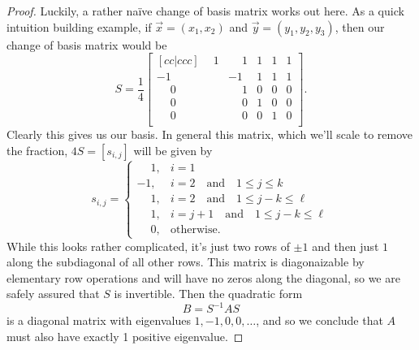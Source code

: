 \documentclass[12pt,oneside]{../../sfsuthesis}
\begin{document}
\begin{proof}
    Luckily, a rather na\"ive change of basis matrix works out here.
    As a quick intuition building example, if \( \vec{x} = ( x_1, x_2) \) and \( \vec{y} = (y_1, y_2, y_3) \), then our change of basis matrix would be
    \[
        S = \frac{1}{4}
        \begin{bmatrix}[cc|ccc]
            \phantom{-}1 & \phantom{-}1 & 1 & 1 & 1 \\
            -1           & -1           & 1 & 1 & 1 \\
            \phantom{-}0 & \phantom{-}1 & 0 & 0 & 0 \\
            \phantom{-}0 & \phantom{-}0 & 1 & 0 & 0 \\
            \phantom{-}0 & \phantom{-}0 & 0 & 1 & 0 \\
        \end{bmatrix}.
    \]
    Clearly this gives us our basis.
    In general this matrix, which we'll scale to remove the fraction, \( 4S = [s_{i,j}] \) will be given by
    \[
        s_{i,j}  = \begin{cases}
            \phantom{-}1, & i = 1                                                  \\
            -1,           & i = 2 \quad \text{and} \quad 1 \leq j \leq k           \\
            \phantom{-}1, & i = 2 \quad \text{and} \quad 1 \leq j-k \leq \ell      \\
            \phantom{-}1, & i = j + 1  \quad \text{and} \quad 1 \leq j-k \leq \ell \\
            \phantom{-}0, & \text{otherwise}.
        \end{cases}
    \]
    While this looks rather complicated, it's just two rows of \( \pm 1 \) and then just \( 1 \) along the subdiagonal of all other rows.
    This matrix is diagonaizable by elementary row operations and will have no zeros along the diagonal, so we are safely assured that \( S \) is invertible.
    Then the quadratic form
    \[
        B = S^{-1}AS
    \]
    is a diagonal matrix with eigenvalues \( 1, -1, 0, 0, \dots \), and so we conclude that \( A \) must also have exactly 1 positive eigenvalue.


\end{proof}
\end{document}
